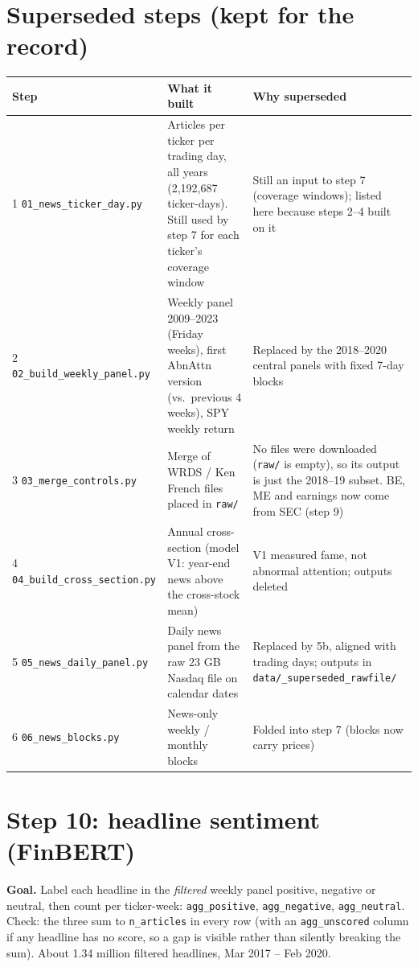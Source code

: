 \documentclass[11pt]{article}
\newcommand{\var}[1]{\texttt{#1}}
\begin{document}
\section{Superseded steps (kept for the record)}

\begin{center}\small
\begin{tabularx}{\textwidth}{@{}l L L@{}}
\toprule
Step & What it built & Why superseded\\
 \var{01\_news\_ticker\_day.py} & Articles per ticker per trading day, all years (2,192,687 ticker-days). Still used by step 7 for each ticker's coverage window & Still an input to step 7 (coverage windows); listed here because steps 2--4 built on it\\
2 \var{02\_build\_weekly\_panel.py} & Weekly panel 2009--2023 (Friday weeks), first AbnAttn version (vs.\ previous 4 weeks), SPY weekly return & Replaced by the 2018--2020 central panels with fixed 7-day blocks\\
3 \var{03\_merge\_controls.py} & Merge of WRDS / Ken French files placed in \var{raw/} & No files were downloaded (\var{raw/} is empty), so its output is just the 2018--19 subset. BE, ME and earnings now come from SEC (step 9)\\
4 \var{04\_build\_cross\_section.py} & Annual cross-section (model V1: year-end news above the cross-stock mean) & V1 measured fame, not abnormal attention; outputs deleted\\
5 \var{05\_news\_daily\_panel.py} & Daily news panel from the raw 23 GB Nasdaq file on calendar dates & Replaced by 5b, aligned with trading days; outputs in \var{data/\_superseded\_rawfile/}\\
6 \var{06\_news\_blocks.py} & News-only weekly / monthly blocks & Folded into step 7 (blocks now carry prices)\\
\bottomrule
\end{tabularx}
\end{center}

\section{Step 10: headline sentiment (FinBERT)}\label{sec:sentiment}

\textbf{Goal.} Label each headline in the \emph{filtered} weekly panel positive, negative or neutral, then count per ticker-week: \var{agg\_positive}, \var{agg\_negative}, \var{agg\_neutral}. Check: the three sum to \var{n\_articles} in every row (with an \var{agg\_unscored} column if any headline has no score, so a gap is visible rather than silently breaking the sum). About 1.34 million filtered headlines, Mar 2017 -- Feb 2020.
\end{document}
